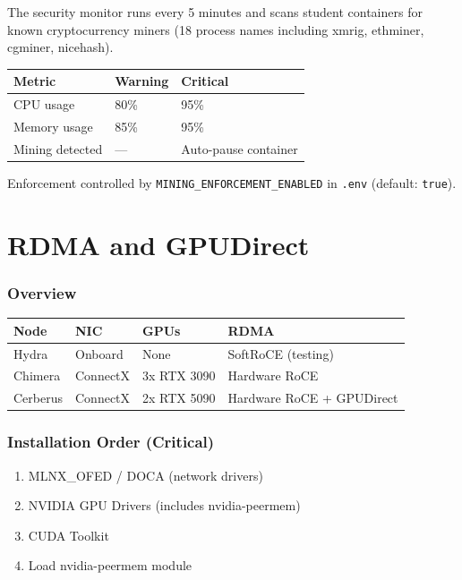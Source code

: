 \documentclass[11pt,a4paper]{article}
\begin{document}
The security monitor runs every 5 minutes and scans student containers for known cryptocurrency miners (18 process names including xmrig, ethminer, cgminer, nicehash).

\begin{table}[H]
\centering
\begin{tabular}{lll}
\toprule
\textbf{Metric} & \textbf{Warning} & \textbf{Critical} \\
\midrule
CPU usage & 80\% & 95\% \\
Memory usage & 85\% & 95\% \\
Mining detected & --- & Auto-pause container \\
\bottomrule
\end{tabular}
\end{table}

Enforcement controlled by \texttt{MINING\_ENFORCEMENT\_ENABLED} in \texttt{.env} (default: \texttt{true}).

\newpage
\part{RDMA and GPUDirect}

\section{Overview}

\begin{table}[H]
\centering
\begin{tabular}{llll}
\toprule
\textbf{Node} & \textbf{NIC} & \textbf{GPUs} & \textbf{RDMA} \\
\midrule
Hydra & Onboard & None & SoftRoCE (testing) \\
Chimera & ConnectX & 3x RTX 3090 & Hardware RoCE \\
Cerberus & ConnectX & 2x RTX 5090 & Hardware RoCE + GPUDirect \\
\bottomrule
\end{tabular}
\end{table}

\section{Installation Order (Critical)}

\begin{enumerate}
    \item MLNX\_OFED / DOCA (network drivers)
    \item NVIDIA GPU Drivers (includes nvidia-peermem)
    \item CUDA Toolkit
    \item Load nvidia-peermem module
\end{enumerate}
\end{document}
